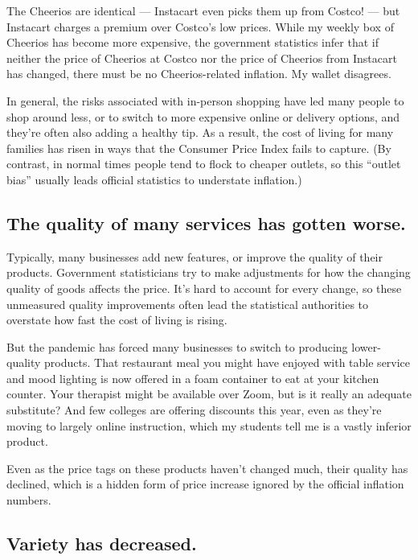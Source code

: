 The Cheerios are identical --- Instacart even picks them up from Costco!
--- but Instacart charges a premium over Costco's low prices. While my
weekly box of Cheerios has become more expensive, the government
statistics infer that if neither the price of Cheerios at Costco nor the
price of Cheerios from Instacart has changed, there must be no
Cheerios-related inflation. My wallet disagrees.

In general, the risks associated with in-person shopping have led many
people to shop around less, or to switch to more expensive online or
delivery options, and they're often also adding a healthy tip. As a
result, the cost of living for many families has risen in ways that the
Consumer Price Index fails to capture. (By contrast, in normal times
people tend to flock to cheaper outlets, so this ``outlet bias'' usually
leads official statistics to understate inflation.)

\hypertarget{the-quality-of-many-services-has-gotten-worse}{%
\subsection{The quality of many services has gotten
worse.}\label{the-quality-of-many-services-has-gotten-worse}}

Typically, many businesses add new features, or improve the quality of
their products. Government statisticians try to make adjustments for how
the changing quality of goods affects the price. It's hard to account
for every change, so these unmeasured quality improvements often lead
the statistical authorities to overstate how fast the cost of living is
rising.

But the pandemic has forced many businesses to switch to producing
lower-quality products. That restaurant meal you might have enjoyed with
table service and mood lighting is now offered in a foam container to
eat at your kitchen counter. Your therapist might be available over
Zoom, but is it really an adequate substitute? And few colleges are
offering discounts this year, even as they're moving to largely online
instruction, which my students tell me is a vastly inferior product.

Even as the price tags on these products haven't changed much, their
quality has declined, which is a hidden form of price increase ignored
by the official inflation numbers.

\hypertarget{variety-has-decreased}{%
\subsection{Variety has decreased.}\label{variety-has-decreased}}

